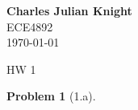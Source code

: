 \documentclass[12pt]{article}
\newtheorem*{prob}{Problem}
\begin{document}
\begin{flushright}
\textbf{Charles Julian Knight}\\
ECE4892\\
\today
\end{flushright}


\begin{center}
\huge HW 1
\end{center}

\begin{prob}[1.a]{
}\end{prob}
\end{document}
